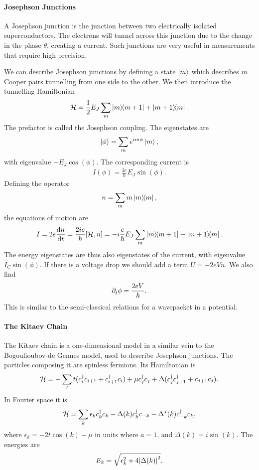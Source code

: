 \paragraph{Josephson Junctions}
A Josephson junction is the junction between two electrically isolated superconductors. The electrons will tunnel across this junction due to the change in the phase $\theta$, creating a current. Such junctions are very useful in measurements that require high precision.

We can describe Josephson junctions by defining a state $\ket{m}$ which describes $m$ Cooper pairs tunnelling from one side to the other. We then introduce the tunnelling Hamiltonian
\begin{align*}
	\mathcal{H} = \frac{1}{2}E_{J}\sum\limits_{m}\op{m}{m + 1} + \op{m + 1}{m}.
\end{align*}
The prefactor is called the Josephson coupling. The eigenstates are
\begin{align*}
	\ket{\phi} = \sum\limits_{m}e^{im\phi}\ket{m},
\end{align*}
with eigenvalue $-E_{J}\cos(\phi)$. The corresponding current is
\begin{align*}
	I(\phi) = \frac{2e}{\hbar}E_{J}\sin(\phi).
\end{align*}
Defining the operator
\begin{align*}
	n = \sum\limits_{m}m\op{m},
\end{align*}
the equations of motion are
\begin{align*}
	I = 2e\dv{n}{t} = \frac{2ie}{\hbar}\comm{\ham}{n} = -i\frac{e}{\hbar}E_{J}\sum\limits_{m}\op{m}{m + 1} - \op{m + 1}{m}.
\end{align*}
The energy eigenstates are thus also eigenstates of the current, with eigenvalue $I_{C}\sin(\phi)$. If there is a voltage drop we should add a term $U = -2eVn$. We also find
\begin{align*}
	\partial^{}_{t}\phi = \frac{2eV}{\hbar}.
\end{align*}
This is similar to the semi-classical relations for a wavepacket in a potential.

\paragraph{The Kitaev Chain}
The Kitaev chain is a one-dimensional model in a similar vein to the Bogoulioubov-de Gennes model, used to describe Josephson junctions. The particles composing it are spinless fermions. Its Hamiltonian is
\begin{align*}
	\mathcal{H} = -\sum\limits_{i}t(c_{i}^{\dagger} c_{i + 1} + c_{i + 1}^{\dagger} c_{i}) + \mu c_{j}^{\dagger} c_{j} + \Delta(c_{j}^{\dagger} c_{j + 1}^{\dagger} + c_{j + 1}c_{j}).
\end{align*}
In Fourier space it is
\begin{align*}
	\mathcal{H} = \sum\limits_{k}\epsilon_{k}c_{k}^{\dagger} c_{k} - \Delta(k)c_{k}^{\dagger} c_{-k} - \Delta^{\star}(k)c_{-k}^{\dagger} c_{k},
\end{align*}
where $\epsilon_{k} = -2t\cos(k) - \mu$ in units where $a = 1$, and $\Delta(k) = i\sin(k)$. The energies are
\begin{align*}
	E_{k} = \sqrt{\epsilon_{k}^{2} + 4\abs{\Delta(k)}^{2}}.
\end{align*}

